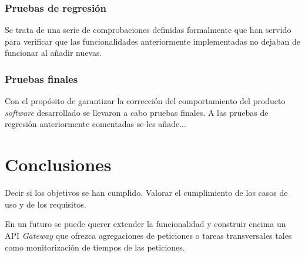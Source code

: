 \documentclass[11pt,spanish,listoffigures]{tfgetsinf}
\begin{document}

		\subsection{Pruebas de regresión}

Se trata de una serie de comprobaciones definidas formalmente que han servido para verificar que las funcionalidades anteriormente implementadas no dejaban de funcionar al añadir nuevas.


		\subsection{Pruebas finales}

Con el propósito de garantizar la corrección del comportamiento del producto \emph{software} desarrollado se llevaron a cabo pruebas finales. A las pruebas de regresión anteriormente comentadas se les añade...


\chapter{Conclusiones}

Decir si los objetivos se han cumplido. Valorar el cumplimiento de los casos de uso y de los requisitos.

En un futuro se puede querer extender la funcionalidad y construir encima un API \emph{Gateway} que ofrezca agregaciones de peticiones o tareas transversales tales como monitorización de tiempos de las peticiones.

\end{document}
